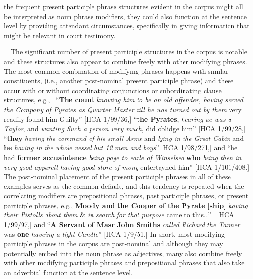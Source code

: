 \documentclass[12pt]{article}
\newenvironment{styleStandard}{\renewcommand\baselinestretch{1.0}\setlength\leftskip{0cm}\setlength\rightskip{0cm plus 1fil}\setlength\parindent{0cm}\setlength\parfillskip{0pt plus 1fil}\setlength\parskip{0in plus 1pt}\writerlistparindent\writerlistleftskip\leavevmode\normalfont\normalsize\writerlistlabel\ignorespaces}{\unskip\vspace{0in plus 1pt}\par}
\newcommand\writerlistleftskip{}
\newcommand\writerlistparindent{}
\newcommand\writerlistlabel{}
\begin{document}
\begin{styleStandard}
the frequent present participle phrase structures evident in the corpus might all be interpreted as noun phrase modifiers, they could also function at the sentence level by providing attendant circumstances, specifically in giving information that might be relevant in court testimony. 
\end{styleStandard}


\begin{styleStandard}
\ \ The significant number of present participle structures in the corpus is notable and these structures also appear to combine freely with other modifying phrases. The most common combination of modifying phrases happens with similar constituents, (i.e., another post-nominal present participle phrase) and these occur with or without coordinating conjunctions or subordinating clause structures, e.g., \ “\textbf{The count} \textit{knowing him to be an old offender, having served the Company of Pyrates as Quarter Master till he was turned out by them} very readily found him Guilty” [HCA 1/99/36,] “\textbf{the Pyrates}, \textit{hearing he was a Taylor}, and \textit{wanting Such a person very much}, did oblidge him” [HCA 1/99/28,] “\textbf{they }\textit{having the command of his small Arms} and \textit{lying in the Great Cabin} and \textbf{he }\textit{having in the whole vessel but 12 men and boys}” [HCA 1/98/271,] and “he had \textbf{former accuaintence} \textit{being page to earle of Winselsea} \textbf{who }\textit{being then in very good apparell having good store of mony }entertayned him” [HCA 1/101/408.] The post-nominal placement of the present participle phrases in all of these examples serves as the common default, and this tendency is repeated when the correlating modifiers are prepositional phrases, past participle phrases, or present participle phrases, e.g., \textbf{Moody and the Cooper of the Pyrate [ship]} \textit{having their Pistolls about them} \& \textit{in search for that purpose }came to this…” ~[HCA 1/99/97,] and “\textbf{A Servant of Masr John Smiths} \textit{called Richard the Tanner }was \textbf{one} \textit{haveing a light Candle}” [HCA 1/9/51.] In short, most modifying participle phrases in the corpus are post-nominal and although they may potentially embed into the noun phrase as adjectives, many also combine freely with other modifying participle phrases and prepositional phrases that also take an adverbial function at the sentence level. 
\end{styleStandard}
\end{document}
